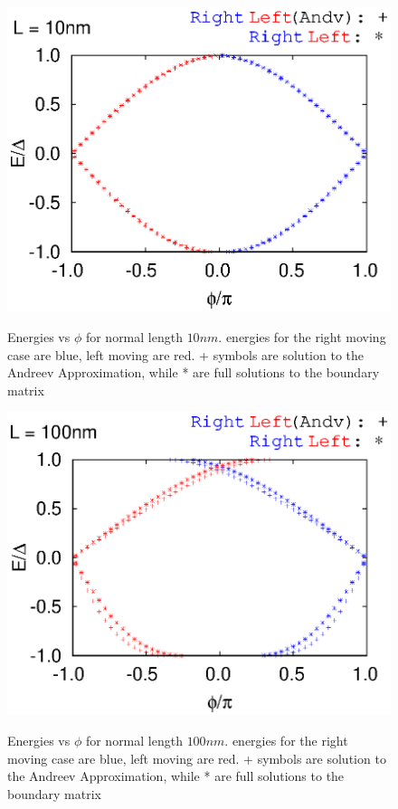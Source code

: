 \documentclass[a4paper,11pt]{article}
\begin{document}
\begin{figure}
  \begin{center}
    \includegraphics{levels_with_p_10L.eps}
    \label{fig:}
    \caption{Energies vs $\phi$ for normal length $10 nm$. energies for the right moving case are blue, left moving are red. + symbols are solution to the Andreev Approximation, while * are full solutions to the boundary matrix}
  \end{center}
\end{figure}

\begin{figure}
  \begin{center}
    \includegraphics{levels_with_p_100L.eps}
    \label{fig:}
    \caption{Energies vs $\phi$ for normal length $100 nm$. energies for the right moving case are blue, left moving are red. + symbols are solution to the Andreev Approximation, while * are full solutions to the boundary matrix}
  \end{center}
\end{figure}
\end{document}

